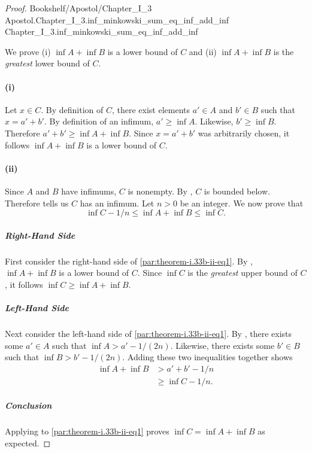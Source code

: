 \documentclass{article}
\newcommand{\link}[1]{\lean{../..}
  {Bookshelf/Apostol/Chapter\_I\_3}
  {Apostol.Chapter\_I\_3.#1}
  {Chapter\_I\_3.#1}
}
\begin{document}
\begin{proof}

  \link{inf\_minkowski\_sum\_eq\_inf\_add\_inf}

  \divider

  We prove (i) $\inf{A} + \inf{B}$ is a lower bound of $C$ and (ii)
    $\inf{A} + \inf{B}$ is the \textit{greatest} lower bound of $C$.

  \paragraph{(i)}%

    Let $x \in C$.
    By definition of $C$, there exist elements $a' \in A$ and $b' \in B$ such
      that $x = a' + b'$.
    By definition of an infimum, $a' \geq \inf{A}$.
    Likewise, $b' \geq \inf{B}$.
    Therefore $a' + b' \geq \inf{A} + \inf{B}$.
    Since $x = a' + b'$ was arbitrarily chosen, it follows $\inf{A} + \inf{B}$
      is a lower bound of $C$.

  \paragraph{(ii)}%

    Since $A$ and $B$ have infimums, $C$ is nonempty.
    By , $C$ is bounded below.
    Therefore  tells us $C$ has an infimum.
    Let $n > 0$ be an integer.
    We now prove that
      \begin{equation}
        \label{par:theorem-i.33b-ii-eq1}
        \inf{C} - 1 / n \leq \inf{A} + \inf{B} \leq \inf{C}.
      \end{equation}

    \subparagraph{Right-Hand Side}%

      First consider the right-hand side of \eqref{par:theorem-i.33b-ii-eq1}.
      By , $\inf{A} + \inf{B}$ is a lower bound of
        $C$.
      Since $\inf{C}$ is the \textit{greatest} upper bound of $C$, it follows
        $\inf{C} \geq \inf{A} + \inf{B}$.

    \subparagraph{Left-Hand Side}%

      Next consider the left-hand side of \eqref{par:theorem-i.33b-ii-eq1}.
      By , there exists some $a' \in A$ such that
        $\inf{A} > a' - 1 / (2n)$.
      Likewise, there exists some $b' \in B$ such that
        $\inf{B} > b' - 1 / (2n)$.
      Adding these two inequalities together shows
        \begin{align*}
          \inf{A} + \inf{B}
            & > a' + b' - 1 / n \\
            & \geq \inf{C} - 1 / n.
        \end{align*}

    \subparagraph{Conclusion}%

      Applying  to \eqref{par:theorem-i.33b-ii-eq1}
        proves $\inf{C} = \inf{A} + \inf{B}$ as expected.

\end{proof}
\end{document}
